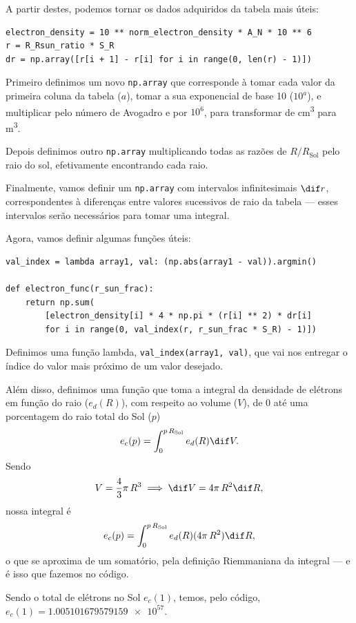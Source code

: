 \documentclass[]{IMTexam}
\begin{document}
\begin{questions}
\begin{parts}
\begin{solution}
			A partir destes, podemos tornar os dados adquiridos da tabela mais úteis:

			\begin{lstlisting}
electron_density = 10 ** norm_electron_density * A_N * 10 ** 6
r = R_Rsun_ratio * S_R
dr = np.array([r[i + 1] - r[i] for i in range(0, len(r) - 1)])
\end{lstlisting}

			Primeiro definimos um novo \lstinline|np.array| que corresponde à tomar cada valor da primeira coluna da tabela ($ a $), tomar a sua exponencial de base 10 ($ 10^{a} $), e multiplicar pelo número de Avogadro e por $ 10^{6} $, para transformar de \si{\centi\meter\cubed} para \si{\meter\cubed}.

			Depois definimos outro \lstinline|np.array| multiplicando todas as razões de $ R/R_{\text{Sol}} $ pelo raio do sol, efetivamente encontrando cada raio.

			Finalmente, vamos definir um \lstinline|np.array| com intervalos infinitesimais $ \dif r $, correspondentes à diferenças entre valores sucessivos de raio da tabela --- esses intervalos serão necessários para tomar uma integral.

			Agora, vamos definir algumas funções úteis:

			\begin{lstlisting}
val_index = lambda array1, val: (np.abs(array1 - val)).argmin()

def electron_func(r_sun_frac):
	return np.sum(
		[electron_density[i] * 4 * np.pi * (r[i] ** 2) * dr[i]
		for i in range(0, val_index(r, r_sun_frac * S_R) - 1)])
\end{lstlisting}

			Definimos uma função lambda, \lstinline|val_index(array1, val)|, que vai nos entregar o índice do valor mais próximo de um valor desejado.

			Além disso, definimos uma função que toma a integral da densidade de elétrons em função do raio ($ e_d(R) $), com respeito ao volume ($ V $), de 0 até uma porcentagem do raio total do Sol ($ p $)
			\[ e_c(p)=\int_{0}^{p\, R_{\text{Sol}}}e_d(R)\dif V. \]
			Sendo
			\[ V=\dfrac{4}{3}\pi\,R^{3}\implies\dif V=4\pi\,R^{2}\dif R, \]
			nossa integral é
			\[ e_c(p)=\int_{0}^{p\, R_{\text{Sol}}}e_d(R)(4\pi\,R^{2})\dif R, \]
			o que se aproxima de um somatório, pela definição Riemmaniana da integral --- e é isso que fazemos no código.

			Sendo o total de elétrons no Sol $ e_c(1) $, temos, pelo código, $ e_c(1)=\num{1.005101679579159e+57}. $
		\end{solution}


\end{parts}
\end{questions}
\end{document}

